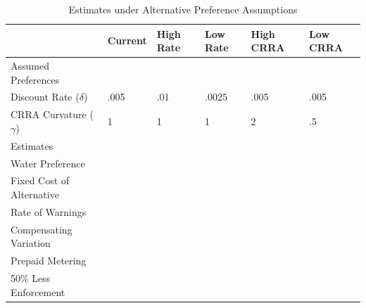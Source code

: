 \documentclass[12pt,table]{article}
\begin{document}
\begin{table}[H]
\centering
\caption{Estimates under Alternative Preference Assumptions}\label{table:robustestimates}
\begin{threeparttable}
\begin{tabular}{@{}l*{1}{FFFFF}@{}}
\toprule
   & Current & High Rate & Low Rate & High CRRA &  Low CRRA \\[.2em]
\midrule   
Assumed Preferences\\
\hspace{1em}Discount Rate ($\delta$)  & .005  & .01 & .0025  & .005 & .005     \\
\hspace{1em}CRRA Curvature ($\gamma$)  & 1  & 1 & 1 & 2 & .5     \\[.5em]
Estimates \\
\hspace{1em}Water Preference  &  &  &  &  &  \\
\hspace{1em}Fixed Cost of Alternative  &    &    &    &    &    \\
\hspace{1em}Rate of Warnings  &   &   &   &   &   \\[.5em]
Compensating Variation \\
\hspace{1em}Prepaid Metering &   &   &   &   &     \\  
\hspace{1em}50\% Less Enforcement &  &  &  &  &     \\
\bottomrule
\end{tabular}
\begin{tablenotes}
\item 
\footnotesize
\end{tablenotes}
\end{threeparttable}
\end{table}
\end{document}
